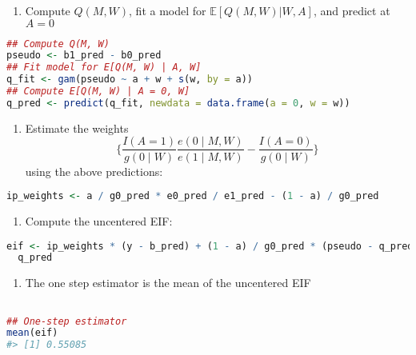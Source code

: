 \documentclass[
  12pt,
]{book}
\providecommand{\tightlist}{%
  \setlength{\itemsep}{0pt}\setlength{\parskip}{0pt}}
\theoremstyle{definition}
\theoremstyle{definition}
\theoremstyle{definition}
\newcommand{\E}{\mathbb{E}}
\newcommand{\1}{\mathbbm{1}}
\begin{document}
\begin{enumerate}
\def\labelenumi{\arabic{enumi}.}
\setcounter{enumi}{2}
\tightlist
\item
  Compute \(Q(M, W)\), fit a model for \(\E[Q(M,W) | W,A]\), and predict at \(A=0\)
\end{enumerate}

\begin{lstlisting}[language=R]
## Compute Q(M, W)
pseudo <- b1_pred - b0_pred
## Fit model for E[Q(M, W) | A, W]
q_fit <- gam(pseudo ~ a + w + s(w, by = a))
## Compute E[Q(M, W) | A = 0, W]
q_pred <- predict(q_fit, newdata = data.frame(a = 0, w = w))
\end{lstlisting}

\begin{enumerate}
\def\labelenumi{\arabic{enumi}.}
\setcounter{enumi}{3}
\tightlist
\item
  Estimate the weights
  \begin{equation*}
    \bigg\{ \frac{I(A=1)}{g(0\mid W)}\frac{e(0\mid M,W)}{e(1\mid M,W)} -
     \frac{I(A=0)}{g(0\mid W)}\bigg\}
    \end{equation*}
  using the above predictions:
\end{enumerate}

\begin{lstlisting}[language=R]
ip_weights <- a / g0_pred * e0_pred / e1_pred - (1 - a) / g0_pred
\end{lstlisting}

\begin{enumerate}
\def\labelenumi{\arabic{enumi}.}
\setcounter{enumi}{4}
\tightlist
\item
  Compute the uncentered EIF:
\end{enumerate}

\begin{lstlisting}[language=R]
eif <- ip_weights * (y - b_pred) + (1 - a) / g0_pred * (pseudo - q_pred) +
  q_pred
\end{lstlisting}

\begin{enumerate}
\def\labelenumi{\arabic{enumi}.}
\setcounter{enumi}{5}
\tightlist
\item
  The one step estimator is the mean of the uncentered EIF
\end{enumerate}

\begin{lstlisting}[language=R]

## One-step estimator
mean(eif)
#> [1] 0.55085
\end{lstlisting}
\end{document}
